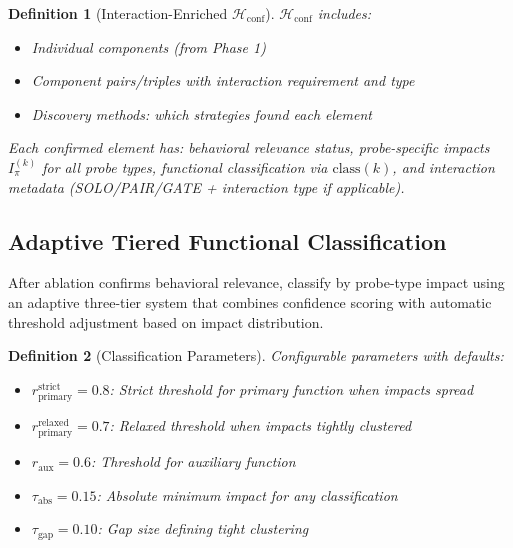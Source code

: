 \documentclass[11pt]{article}
\newtheorem{definition}{Definition}[section]
\begin{document}
\begin{definition}[Interaction-Enriched $\mathcal{H}_{\text{conf}}$]
\label{def:interaction-enriched-confirmed-set}
$\mathcal{H}_{\text{conf}}$ includes:
\begin{itemize}[nosep]
\item Individual components (from Phase 1)
\item Component pairs/triples with interaction requirement and type
\item Discovery methods: which strategies found each element
\end{itemize}
Each confirmed element has: behavioral relevance status, probe-specific impacts $I^{(k)}_\pi$ for all probe types, functional classification via $\text{class}(k)$, and interaction metadata (SOLO/PAIR/GATE + interaction type if applicable).
\end{definition}

\subsection{Adaptive Tiered Functional Classification}
\label{sec:adaptive-tiered-functional-classification}

After ablation confirms behavioral relevance, classify by probe-type impact using an adaptive three-tier system that combines confidence scoring with automatic threshold adjustment based on impact distribution.

\begin{definition}[Classification Parameters]
\label{def:classification-parameters}
Configurable parameters with defaults:
\begin{itemize}[nosep]
\item $r_{\text{primary}}^{\text{strict}} = 0.8$: Strict threshold for primary function when impacts spread
\item $r_{\text{primary}}^{\text{relaxed}} = 0.7$: Relaxed threshold when impacts tightly clustered
\item $r_{\text{aux}} = 0.6$: Threshold for auxiliary function
\item $\tau_{\text{abs}} = 0.15$: Absolute minimum impact for any classification
\item $\tau_{\text{gap}} = 0.10$: Gap size defining tight clustering
\end{itemize}
\end{definition}
\end{document}
